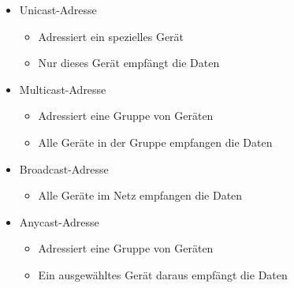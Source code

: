       \begin{itemize}
        \item Unicast-Adresse
          \begin{itemize}
            \item Adressiert ein spezielles Gerät
            \item Nur dieses Gerät empfängt die Daten
          \end{itemize}
        \item Multicast-Adresse
          \begin{itemize}
            \item Adressiert eine Gruppe von Geräten
            \item Alle Geräte in der Gruppe empfangen die Daten
          \end{itemize}
        \item Broadcast-Adresse
          \begin{itemize}
            \item Alle Geräte im Netz empfangen die Daten
          \end{itemize}
        \item Anycast-Adresse
          \begin{itemize}
            \item Adressiert eine Gruppe von Geräten
            \item Ein ausgewähltes Gerät daraus empfängt die Daten
          \end{itemize}
      \end{itemize}

